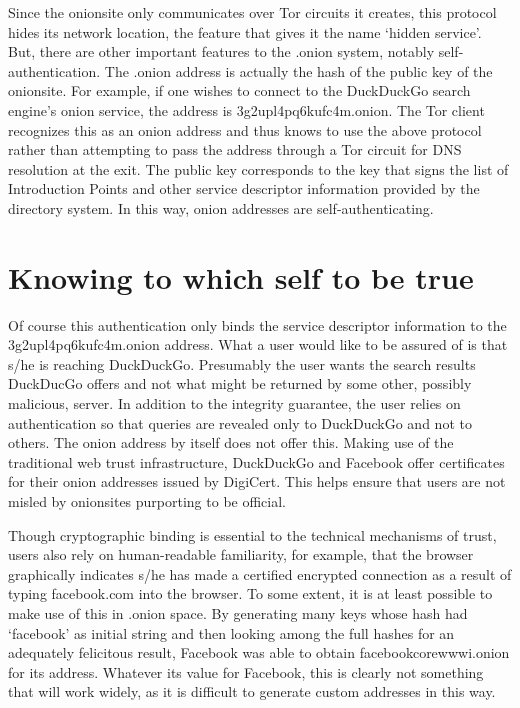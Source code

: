 \documentclass[10pt, conference, compsocconf]{styles/IEEEtran}
\begin{document}
Since the onionsite only communicates over Tor circuits it creates,
this protocol hides its network location, the feature that
gives it the name `hidden service'. But, there are other important
features to the .onion system, notably self-authentication. The .onion
address is actually the hash of the public key of the onionsite. For
example, if one wishes to connect to the DuckDuckGo search engine's
onion service, the address is 3g2upl4pq6kufc4m.onion. The Tor client
recognizes this as an onion address and thus knows to use the above
protocol rather than attempting to pass the address through a Tor
circuit for DNS resolution at the exit. The public key
corresponds to the key that signs the list of Introduction Points
and other service descriptor information provided by the directory
system. In this way, onion addresses are self-authenticating.

\section{Knowing to which self to be true}

Of course this authentication only binds the service descriptor
information to the 3g2upl4pq6kufc4m.onion address. What a user would
like to be assured of is that s/he is reaching DuckDuckGo. Presumably
the user wants the search results DuckDucGo offers and not what might
be returned by some other, possibly malicious, server.  In addition to
the integrity guarantee, the user relies on authentication so that
queries are revealed only to DuckDuckGo and not to others. The onion
address by itself does not offer this. Making use of the traditional
web trust infrastructure, DuckDuckGo and Facebook offer certificates
for their onion addresses issued by DigiCert.  This helps ensure that
users are not misled by onionsites purporting to be official.

Though cryptographic binding is essential to the technical mechanisms
of trust, users also rely on human-readable familiarity, for example,
that the browser graphically indicates s/he has made a certified
encrypted connection as a result of typing facebook.com into the
browser.  To some extent, it is at least possible to make use of this
in .onion space. By generating many keys whose hash had `facebook' as
initial string and then looking among the full hashes for an
adequately felicitous result, Facebook was able to obtain
facebookcorewwwi.onion for its address. Whatever its value for
Facebook, this is clearly not something that will work widely, as it
is difficult to generate custom addresses in this way.
\end{document}
